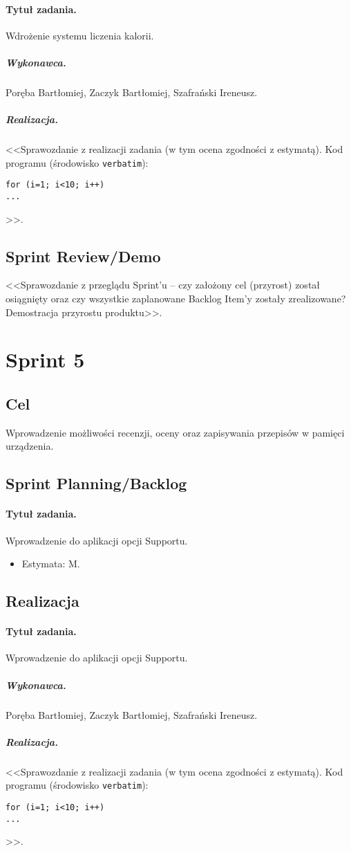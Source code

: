 \documentclass[a4paper]{article}
\begin{document}
\paragraph{Tytuł zadania.} Wdrożenie systemu liczenia kalorii.
\subparagraph{Wykonawca.} Poręba Bartłomiej, Zaczyk Bartłomiej, Szafrański Ireneusz.
\subparagraph{Realizacja.} <<Sprawozdanie z realizacji zadania (w tym ocena zgodności z estymatą). Kod programu (środowisko \texttt{verbatim}): \begin{verbatim}
for (i=1; i<10; i++)
...
\end{verbatim}>>.



\subsection{Sprint Review/Demo}
<<Sprawozdanie z przeglądu Sprint'u -- czy założony cel (przyrost) został osiągnięty oraz czy wszystkie zaplanowane Backlog Item'y zostały zrealizowane? Demostracja przyrostu produktu>>.


\section{Sprint 5}

\subsection{Cel} Wprowadzenie możliwości recenzji, oceny oraz zapisywania przepisów w pamięci urządzenia.

\subsection{Sprint Planning/Backlog}

\paragraph{Tytuł zadania.} Wprowadzenie do aplikacji opcji Supportu.
\begin{itemize}
	\item Estymata: M.
\end{itemize}


\subsection{Realizacja}

\paragraph{Tytuł zadania.} Wprowadzenie do aplikacji opcji Supportu.
\subparagraph{Wykonawca.} Poręba Bartłomiej, Zaczyk Bartłomiej, Szafrański Ireneusz.
\subparagraph{Realizacja.} <<Sprawozdanie z realizacji zadania (w tym ocena zgodności z estymatą). Kod programu (środowisko \texttt{verbatim}): \begin{verbatim}
for (i=1; i<10; i++)
...
\end{verbatim}>>.
\end{document}
